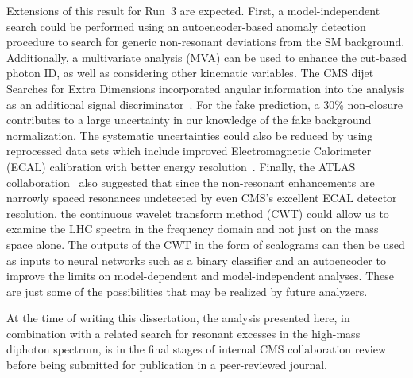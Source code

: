 Extensions of this result for Run~3 are expected. First, a model-independent search could be performed using an autoencoder-based anomaly detection procedure to search for generic non-resonant deviations from the SM background. Additionally, a multivariate analysis (MVA) can be used to enhance the cut-based photon ID, as well as considering other kinematic variables. The CMS dijet Searches for Extra Dimensions incorporated angular information into the analysis as an additional signal discriminator~\cite{CMS:2018mgb}. For the fake prediction, a 30\% non-closure contributes to a large uncertainty in our knowledge of the fake background normalization. The systematic uncertainties could also be reduced by using reprocessed data sets which include improved Electromagnetic Calorimeter (ECAL) calibration with better energy resolution~\cite{Cavallari:2020ydz}. Finally, the ATLAS collaboration~\cite{ATLAS:2023hbp} also suggested that since the non-resonant enhancements are narrowly spaced resonances undetected by even CMS's excellent ECAL detector resolution, the continuous wavelet transform method (CWT) could allow us to examine the LHC spectra in the frequency domain and not just on the mass space alone. The outputs of the CWT in the form of scalograms can then be used as inputs to neural networks such as a binary classifier and an autoencoder to improve the limits on model-dependent and model-independent analyses. These are just some of the possibilities that may be realized by future analyzers.



At the time of writing this dissertation, the analysis presented here, in combination with a related search for resonant excesses in the high-mass diphoton spectrum, is in the final stages of internal CMS collaboration review before being submitted for publication in a peer-reviewed journal.


